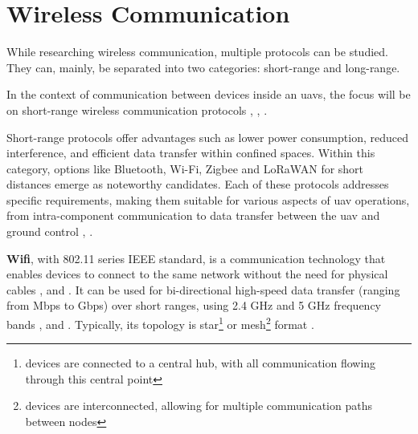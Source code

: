 

\section{Wireless Communication}

While researching wireless communication, multiple protocols can be studied.
They can, mainly, be separated into two categories: short-range and long-range.

In the context of communication between devices inside an \glspl{uav}, the focus will be on short-range wireless communication protocols \cite{WCOM1}, \cite{WCOM6}, \cite{WCOM7}.

Short-range protocols offer advantages such as lower power consumption, reduced interference, and efficient data transfer within confined spaces.
Within this category, options like Bluetooth, Wi-Fi, Zigbee and \gls{LoRaWAN} for short distances emerge as noteworthy candidates.
Each of these protocols addresses specific requirements, making them suitable for various aspects of \gls{uav} operations, from intra-component communication to data transfer between the \gls{uav} and ground control \cite{WCOM6}, \cite{WCOM7}.

\textbf{\gls{Wifi}}, with 802.11 series \gls{IEEE} standard, is a communication technology that enables devices to connect to the same network without the need for physical cables \cite{WCOM8}, \cite{WCOM11} and \cite{WCOM12}.
It can be used for bi-directional high-speed data transfer (ranging from Mbps to Gbps) over short ranges, using 2.4 GHz and 5 GHz frequency bands \cite{WCOM8}, \cite{WCOM11} and \cite{WCOM12}.
Typically, its topology is star\footnote{devices are connected to a central hub, with all communication flowing through this central point} or mesh\footnote{devices are interconnected, allowing for multiple communication paths between nodes} format \cite{WCOM8}.

